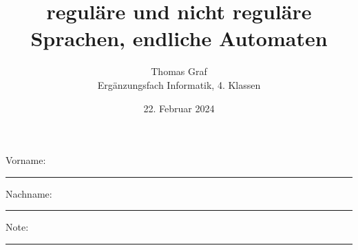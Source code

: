 \newtoggle{withbonus} \toggletrue{withbonus} %

\newcommand{\mycourse}{Ergänzungsfach Informatik}
\newcommand{\myclass}{4. Klassen}
\newcommand{\mydate}{22. Februar 2024}

\title{\textbf{reguläre und nicht reguläre Sprachen, endliche Automaten}}
\author{Thomas Graf\\
	\mycourse, \myclass}
\date{\mydate}
\maketitle
\thispagestyle{headandfoot}

\begin{center}
\end{center}
\vspace{10mm}

\begin{center}
	Vorname: \rule{45mm}{0.8pt}\qquad Nachname: \rule{45mm}{0.8pt}
\end{center}
\vspace{20mm}

\begin{center}
	\iftoggle{withbonus} {
		\combinedgradetable[h][questions]
	} {
		\gradetable[h][questions]
	}
\end{center}
\vspace{15mm}
\begin{center}
	Note:
	\vspace{10mm}

	\rule{8mm}{1.2pt}
\end{center}
\clearpage

